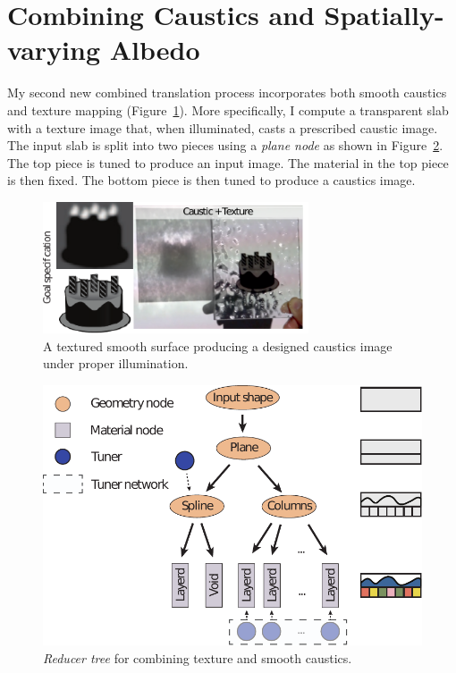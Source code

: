 \section{Combining Caustics and Spatially-varying Albedo}
My second new combined translation process incorporates both smooth caustics and texture mapping
(Figure~\ref{fig:cake}).
More specifically, I compute a transparent slab with a texture image that, when illuminated, casts a prescribed caustic image.
The input slab is split into two pieces using a \emph{plane node} as shown in Figure~\ref{fig:treeTexSpline}.
The top piece is tuned to produce an input image. The material in the top piece is then fixed. The bottom piece is then tuned to produce a caustics image.
\begin{figure}[h]
\centering
\includegraphics[width=0.7\textwidth]{figure/cake.pdf}
\caption {A textured smooth surface producing a designed caustics image under proper illumination.}
\label{fig:cake}
\end{figure}

\begin{figure}[h]
\centering
\includegraphics[scale=0.7]{figure/treeTexSpline.pdf}
\caption {\emph{Reducer tree} for combining texture and smooth caustics.
}
\label{fig:treeTexSpline}
\end{figure}

